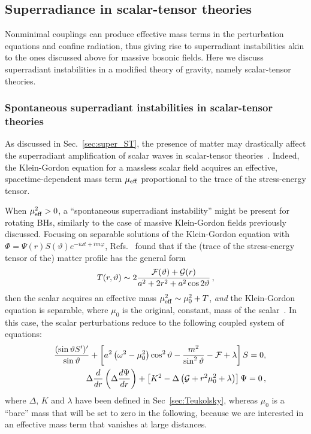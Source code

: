 \documentclass[11pt]{article}
\newcommand{\be}{\begin{equation}}
\newcommand{\ee}{\end{equation}}
\def\beq{\begin{eqnarray}}
\def\eeq{\end{eqnarray}}
\newcommand{\nn}{\nonumber}
\numberwithin{equation}{section} %
\begin{document}
\subsection{Superradiance in scalar-tensor theories}\label{sec:nonminimal}
Nonminimal couplings can produce effective mass terms in the perturbation equations and confine radiation, thus giving rise to superradiant instabilities akin to the ones discussed above for massive bosonic fields. Here we discuss superradiant instabilities in a modified theory of gravity, namely scalar-tensor theories.




\subsubsection{Spontaneous superradiant instabilities in scalar-tensor theories}
As discussed in Sec.~\ref{sec:super_ST}, the presence of matter may drastically affect the superradiant amplification of scalar waves in scalar-tensor theories~\cite{Cardoso:2013fwa,Cardoso:2013opa}. Indeed, the Klein-Gordon equation for a massless scalar field acquires an effective, spacetime-dependent mass term $\mu_{\rm eff}$ proportional to the trace of the stress-energy tensor. 

When $\mu_{\rm eff}^2>0$, a ``spontaneous superradiant instability'' might be present for rotating BHs, similarly to the case of massive Klein-Gordon fields previously discussed. 
Focusing on separable solutions of the Klein-Gordon equation with $\Phi=\Psi(r)S(\vartheta)e^{-i\omega t+im\varphi}$, Refs.~\cite{Cardoso:2013fwa,Cardoso:2013opa} found that if the (trace of the stress-energy tensor of the) matter profile has the general form
%
\be
T(r,\vartheta)\sim 2\frac{{\cal F}(\vartheta)+{\cal G}(r)}{a^2+2r^2+a^2\cos2\vartheta}\,,\label{separable2}
\ee
%
then the scalar acquires an effective mass $\mu_{\rm eff}^2\sim \mu_0^2+T$, {\it and} the Klein-Gordon equation is separable, where
$\mu_0$ is the original, constant, mass of the scalar~\cite{Cardoso:2013fwa,Cardoso:2013opa}. In this case, the scalar perturbations reduce to the following coupled system of equations:
%
\beq
&&\frac{(\sin\vartheta S')'}{\sin\vartheta}+\left[
a^2\left(\omega^2-\mu_0^2\right)\cos^2\vartheta-\frac{m^2}{\sin^2\vartheta}-
{\cal F}+\lambda \right]S=0,\nn\\
%
&&\Delta 
\frac{d}{dr}\left(\Delta\frac{d\Psi}{dr}\right)+\left[
K^2-\Delta\left({\cal G}+r^2\mu_0^2+\lambda\right)\right]\Psi=0\,,\nn
\eeq
%
where $\Delta$, $K$ and $\lambda$ have been defined in Sec~\ref{sec:Teukolsky}, whereas $\mu_0$ is a ``bare'' mass that will be set to zero in the following, because we are interested in an effective mass term that vanishes at large distances.
\end{document}
